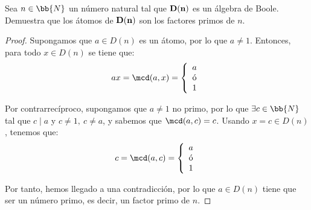 \begin{ejercicio}
    Sea $n\in \bb{N}$ un número natural tal que $\bf{D}(n)$ es un álgebra de Boole. Demuestra que
    los átomos de $\bf{D}(n)$ son los factores primos de $n$.
    \begin{proof}
        Supongamos que $a\in D(n)$ es un átomo, por lo que $a\neq 1$. Entonces, para todo $x\in D(n)$ se tiene que:
        \begin{equation*}
            ax = \mcd(a,x) = \left\{
                \begin{array}{c}
                    a \\
                    \text{ó} \\
                    1
                \end{array}
            \right.
        \end{equation*}

        Por contrarrecíproco, supongamos que $a\neq 1$ no primo, por lo que $\exists c\in \bb{N}$ tal que $c\mid a$ y $c\neq 1,~c\neq a$,
        y sabemos que $\mcd(a,c)=c$. Usando $x=c\in D(n)$, tenemos que:
        \begin{equation*}
            c = \mcd(a,c) = \left\{
                \begin{array}{c}
                    a \\
                    \text{ó} \\
                    1
                \end{array}
            \right.
        \end{equation*}

        Por tanto, hemos llegado a una contradicción, por lo que $a\in D(n)$ tiene que ser un número primo, es decir, un factor primo de $n$.
    \end{proof}
\end{ejercicio}




